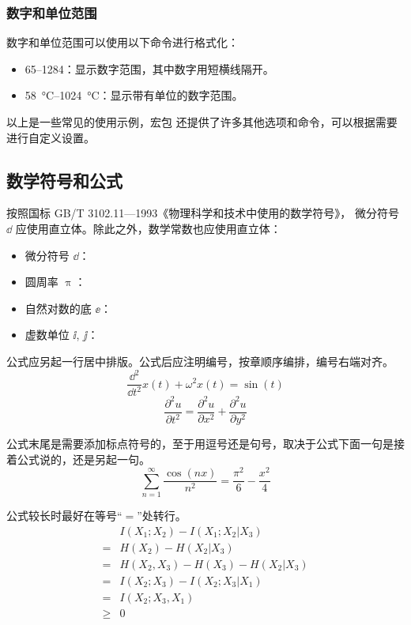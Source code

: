 \subsubsection*{数字和单位范围}

数字和单位范围可以使用以下命令进行格式化：

\begin{itemize}
\item \numrange{65}{1284}：显示数字范围，其中数字用短横线隔开。
\item \SIrange{58}{1024}{\degreeCelsius}：显示带有单位的数字范围。
\end{itemize}

以上是一些常见的使用示例，宏包  还提供了许多其他选项和命令，可以根据需要进行自定义设置。

\subsection{数学符号和公式}

按照国标 GB/T 3102.11—1993《物理科学和技术中使用的数学符号》，
微分符号 $\dd$ 应使用直立体。除此之外，数学常数也应使用直立体：
\begin{itemize}
  \item 微分符号 $\dd$：
  \item 圆周率 $\uppi$：
  \item 自然对数的底 $\ee$：
  \item 虚数单位 $\ii$, $\jj$： 
\end{itemize}

公式应另起一行居中排版。公式后应注明编号，按章顺序编排，编号右端对齐。
\begin{equation}
  \frac{\dd^2}{\dd t^2}x(t)+\omega^2x(t)=\sin(t)
\end{equation}
\begin{equation}
  \frac{\partial^2u}{\partial t^2}=\frac{\partial^2u}{\partial x^2}+\frac{\partial^2u}{\partial y^2}
\end{equation}

公式末尾是需要添加标点符号的，至于用逗号还是句号，取决于公式下面一句是接着公式说的，还是另起一句。
\begin{equation}
		\sum_{n=1}^{\infty}\frac{\cos(nx)}{n^2}=\frac{\pi^2}{6}-\frac{x^2}{4}
\end{equation}

公式较长时最好在等号“$=$”处转行。
\begin{align}
    & I(X_1;X_2)-I(X_1;X_2|X_3) \nonumber \\
  = & H(X_2)-H(X_2|X_3) \nonumber \\
  = & H(X_2,X_3)-H(X_3)-H(X_2|X_3) \nonumber \\
  = & I(X_2;X_3)-I(X_2;X_3|X_1) \nonumber \\
  = & I(X_2;X_3,X_1) \nonumber \\
  \geq & 0
\end{align}

